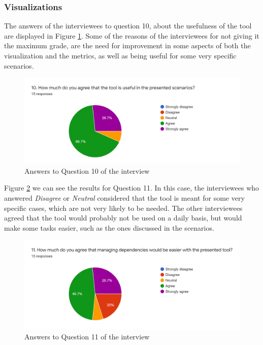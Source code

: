 \subsubsection{Visualizations}

The answers of the interviewees to question 10, about the usefulness of the tool are displayed in Figure \ref{fig:interview-10}. Some of the reasons of the interviewees for not giving it the maximum grade, are the need for improvement in some aspects of both the visualization and the metrics, as well as being useful for some very specific scenarios.

\begin{figure}[ht]
\begin{center}
\includegraphics[width=\textwidth]{figures/interview/Question10.png}
\caption{Answers to Question 10 of the interview}
\label{fig:interview-10}
\end{center}
\end{figure}

Figure \ref{fig:interview-11} we can see the results for Question 11. In this case, the interviewees who answered \textit{Disagree} or \textit{Neutral} considered that the tool is meant for some very specific cases, which are not very likely to be needed. The other interviewees agreed that the tool would probably not be used on a daily basis, but would make some tasks easier, such as the ones discussed in the scenarios.

\begin{figure}[ht]
\begin{center}
\includegraphics[width=\textwidth]{figures/interview/Question11.png}
\caption{Answers to Question 11 of the interview}
\label{fig:interview-11}
\end{center}
\end{figure}

